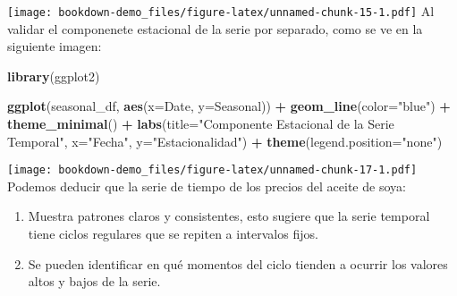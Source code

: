 \documentclass[
]{book}
\newenvironment{Shaded}{\begin{snugshade}}{\end{snugshade}}
\newcommand{\AttributeTok}[1]{\textcolor[rgb]{0.13,0.29,0.53}{#1}}
\newcommand{\CommentTok}[1]{\textcolor[rgb]{0.56,0.35,0.01}{\textit{#1}}}
\newcommand{\FunctionTok}[1]{\textcolor[rgb]{0.13,0.29,0.53}{\textbf{#1}}}
\newcommand{\NormalTok}[1]{#1}
\newcommand{\OtherTok}[1]{\textcolor[rgb]{0.56,0.35,0.01}{#1}}
\newcommand{\SpecialCharTok}[1]{\textcolor[rgb]{0.81,0.36,0.00}{\textbf{#1}}}
\newcommand{\StringTok}[1]{\textcolor[rgb]{0.31,0.60,0.02}{#1}}
\begin{document}
\texttt{[image: bookdown-demo\_files/figure-latex/unnamed-chunk-15-1.pdf]}
Al validar el componenete estacional de la serie por separado, como se ve en la siguiente imagen:

\begin{Shaded}
\end{Shaded}

\begin{Shaded}
\begin{Highlighting}[]
\FunctionTok{library}\NormalTok{(ggplot2)}

\FunctionTok{ggplot}\NormalTok{(seasonal\_df, }\FunctionTok{aes}\NormalTok{(}\AttributeTok{x=}\NormalTok{Date, }\AttributeTok{y=}\NormalTok{Seasonal)) }\SpecialCharTok{+}
  \FunctionTok{geom\_line}\NormalTok{(}\AttributeTok{color=}\StringTok{"blue"}\NormalTok{) }\SpecialCharTok{+}
  \FunctionTok{theme\_minimal}\NormalTok{() }\SpecialCharTok{+}
  \FunctionTok{labs}\NormalTok{(}\AttributeTok{title=}\StringTok{"Componente Estacional de la Serie Temporal"}\NormalTok{, }\AttributeTok{x=}\StringTok{"Fecha"}\NormalTok{, }\AttributeTok{y=}\StringTok{"Estacionalidad"}\NormalTok{) }\SpecialCharTok{+}
  \FunctionTok{theme}\NormalTok{(}\AttributeTok{legend.position=}\StringTok{"none"}\NormalTok{)}
\end{Highlighting}
\end{Shaded}

\texttt{[image: bookdown-demo\_files/figure-latex/unnamed-chunk-17-1.pdf]}
Podemos deducir que la serie de tiempo de los precios del aceite de soya:

\begin{enumerate}
\def\labelenumi{\arabic{enumi}.}
\item
  Muestra patrones claros y consistentes, esto sugiere que la serie temporal tiene ciclos regulares que se repiten a intervalos fijos.
\item
  Se pueden identificar en qué momentos del ciclo tienden a ocurrir los valores altos y bajos de la serie.
\end{enumerate}
\end{document}
